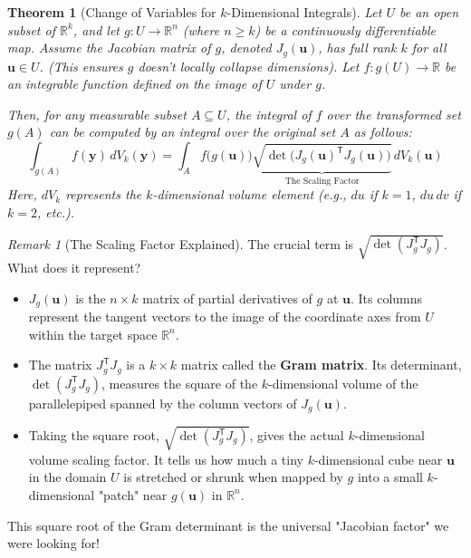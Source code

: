 \documentclass[12pt]{article}
\theoremstyle{definition} %
\theoremstyle{plain} %
\newtheorem{theorem}[definition]{Theorem}
\theoremstyle{remark} %
\newtheorem{remark}[definition]{Remark}
\begin{document}
\begin{theorem}[Change of Variables for $k$-Dimensional Integrals]\label{thm:COV}
Let $U$ be an open subset of $\mathbb{R}^k$, and let $g: U \to \mathbb{R}^n$ (where $n \ge k$) be a continuously differentiable map. Assume the Jacobian matrix of $g$, denoted $J_g(\mathbf{u})$, has full rank $k$ for all $\mathbf{u} \in U$. (This ensures $g$ doesn't locally collapse dimensions). Let $f: g(U) \to \mathbb{R}$ be an integrable function defined on the image of $U$ under $g$.

Then, for any measurable subset $A \subseteq U$, the integral of $f$ over the transformed set $g(A)$ can be computed by an integral over the original set $A$ as follows:
\[
    \int_{g(A)} f(\mathbf{y})\,d V_k(\mathbf{y}) = \int_{A} f\bigl(g(\mathbf{u})\bigr) \underbrace{\sqrt{\det\bigl(J_g(\mathbf{u})^{\mathsf{T}} J_g(\mathbf{u})\bigr)}}_{\text{The Scaling Factor}}\,d V_k(\mathbf{u})
\]
Here, $d V_k$ represents the $k$-dimensional volume element (e.g., $du$ if $k=1$, $du\,dv$ if $k=2$, etc.).
\end{theorem}

\begin{remark}[The Scaling Factor Explained]
The crucial term is $\sqrt{\det(J_g^{\mathsf{T}} J_g)}$. What does it represent?
\begin{itemize}
    \item $J_g(\mathbf{u})$ is the $n \times k$ matrix of partial derivatives of $g$ at $\mathbf{u}$. Its columns represent the tangent vectors to the image of the coordinate axes from $U$ within the target space $\mathbb{R}^n$.
    \item The matrix $J_g^{\mathsf{T}} J_g$ is a $k \times k$ matrix called the \textbf{Gram matrix}. Its determinant, $\det(J_g^{\mathsf{T}} J_g)$, measures the square of the $k$-dimensional volume of the parallelepiped spanned by the column vectors of $J_g(\mathbf{u})$.
    \item Taking the square root, $\sqrt{\det(J_g^{\mathsf{T}} J_g)}$, gives the actual $k$-dimensional volume scaling factor. It tells us how much a tiny $k$-dimensional cube near $\mathbf{u}$ in the domain $U$ is stretched or shrunk when mapped by $g$ into a small $k$-dimensional "patch" near $g(\mathbf{u})$ in $\mathbb{R}^n$.
\end{itemize}
This square root of the Gram determinant is the universal "Jacobian factor" we were looking for!
\end{remark}
\end{document}
